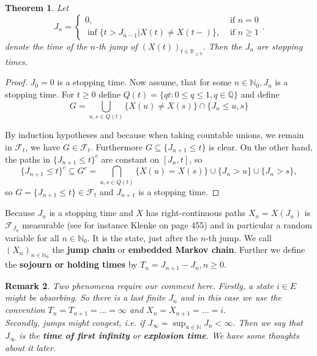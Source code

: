 \documentclass[12pt,a4paper]{scrartcl}
\newtheorem{theorem}{Theorem}[section]
\newtheorem {remark}[theorem]{Remark}
\numberwithin{equation}{section}
\newcommand{\R}{\mathbb{R}} %
\newcommand{\N}{\mathbb{N}} %
\begin{document}
\begin{theorem} Let
$$ J_n=\begin{cases} 0, & \mbox{ if } n = 0 \\ \inf \lbrace t > J_{n-1} | X\left(t\right) \neq X\left(t-\right) \rbrace, & \mbox{ if } n \geq 1 \end{cases}. $$
denote the time of the $n$-th jump of $\left(X\left(t\right)\right)_{t \in \R_{\geq 0}}$. Then the $J_n$ are stopping times.
\end{theorem}
\begin{proof}
$J_0 = 0$ is a stopping time.
Now assume, that for some $ n \in \N_0 , J_n $ is a stopping time. For $ t \geq 0 $ define $ Q\left(t\right) = \lbrace  qt : 0 \leq q \leq 1, q \in \mathbb{Q} \rbrace  $ and define
\begin{equation}
G = \bigcup_{u,s \in Q\left(t\right)} \lbrace X\left(u\right) \neq X\left(s\right)  \rbrace  \cap \lbrace J_{n} \leq u,s \rbrace 
\end{equation}

By induction hypotheses and because when taking countable unions, we remain in $ \mathcal{F}_t $, we have $ G \in \mathcal{F}_t $. Furthermore $ G \subseteq \lbrace J_{n+1} \leq t \rbrace  $ is clear.
On the other hand, the paths in  $\lbrace J_{n+1} \leq t \rbrace ^c $ are constant on $ \left[J_n, t\right] $, so
$$ \lbrace J_{n+1} \leq t \rbrace ^c \subseteq G^c = \bigcap_{u,s \in Q\left(t\right)} \lbrace  X\left(u\right) = X\left(s\right)  \rbrace  \cup \lbrace J_n > u \rbrace \cup \lbrace J_n > s \rbrace  ,$$ so $ G = \lbrace J_{n+1} \leq t \rbrace  \in \mathcal{F}_t $ and $ J_{n+1} $ is a stopping time.
\end{proof}

Because $J_n$ is a stopping time and $X$ has right-continuous paths $X_n = X\left(J_n\right)$ is $\mathcal{F}_{J_n}$ measurable (see for instance Klenke \cite{klenke} on page 455) and in particular a random variable for all $n \in \N_0$. It is the state, just after the $n$-th jump. We call $ \left(X_n\right)_{n \in \N_0}  $ the \textbf{jump chain} or \textbf{embedded Markov chain}.
Further we define the \textbf{sojourn or holding times} by $ T_n = J_{n+1} - J_n , n \geq 0 $.

\begin{remark}
Two phenomena require our comment here. Firstly, a state $ i \in E $ might be absorbing. So there is a last finite $ J_n $ and in this case we use the convention $T_n = T_{n+1} = \ldots = \infty$ and $X_n = X_{n+1} = \ldots = i.$ \\
Secondly, jumps might congest, i.e. if $ J_{\infty} = \sup_{n \in \N} J_n < \infty $. Then we say that $ J_{\infty} $ is the \textbf{time of first infinity} or \textbf{explosion time}. We have some thoughts about it later.
\end{remark}
\end{document}
